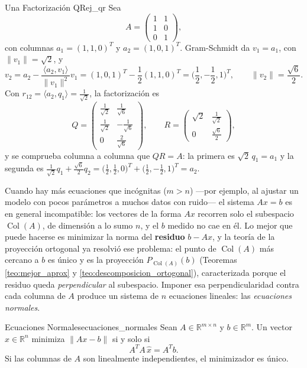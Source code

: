\documentclass[11pt, a4paper]{article}
\begin{document}
\begin{ejemplo}{Una Factorización QR}{ej_qr}
Sea
\[
A = \begin{pmatrix} 1 & 1 \\ 1 & 0 \\ 0 & 1 \end{pmatrix},
\]
con columnas $a_1 = (1,1,0)^T$ y $a_2 = (1,0,1)^T$. Gram-Schmidt da $v_1 = a_1$, con $\|v_1\| = \sqrt{2}$, y
\[
v_2 = a_2 - \frac{\langle a_2, v_1 \rangle}{\|v_1\|^2} v_1 = (1,0,1)^T - \frac{1}{2}(1,1,0)^T = \Big( \frac{1}{2}, -\frac{1}{2}, 1 \Big)^T,
\qquad \|v_2\| = \frac{\sqrt{6}}{2}.
\]
Con $r_{12} = \langle a_2, q_1 \rangle = \frac{1}{\sqrt{2}}$, la factorización es
\[
Q = \begin{pmatrix} \frac{1}{\sqrt{2}} & \frac{1}{\sqrt{6}} \\ \frac{1}{\sqrt{2}} & -\frac{1}{\sqrt{6}} \\ 0 & \frac{2}{\sqrt{6}} \end{pmatrix}, \qquad
R = \begin{pmatrix} \sqrt{2} & \frac{1}{\sqrt{2}} \\ 0 & \frac{\sqrt{6}}{2} \end{pmatrix},
\]
y se comprueba columna a columna que $QR = A$: la primera es $\sqrt{2} \, q_1 = a_1$ y la segunda es $\frac{1}{\sqrt{2}} q_1 + \frac{\sqrt{6}}{2} q_2 = \big( \frac{1}{2}, \frac{1}{2}, 0 \big)^T + \big( \frac{1}{2}, -\frac{1}{2}, 1 \big)^T = a_2$.
\end{ejemplo}

Cuando hay más ecuaciones que incógnitas ($m > n$) —por ejemplo, al ajustar un modelo con pocos parámetros a muchos datos con ruido— el sistema $Ax = b$ es en general incompatible: los vectores de la forma $Ax$ recorren solo el subespacio $\operatorname{Col}(A)$, de dimensión a lo sumo $n$, y el $b$ medido no cae en él. Lo mejor que puede hacerse es minimizar la norma del \textbf{residuo} $b - Ax$, y la teoría de la proyección ortogonal ya resolvió ese problema: el punto de $\operatorname{Col}(A)$ más cercano a $b$ es único y es la proyección $P_{\operatorname{Col}(A)}(b)$ (Teoremas \ref{teo:mejor_aprox} y \ref{teo:descomposicion_ortogonal}), caracterizada porque el residuo queda \emph{perpendicular} al subespacio. Imponer esa perpendicularidad contra cada columna de $A$ produce un sistema de $n$ ecuaciones lineales: las \emph{ecuaciones normales}.

\begin{teorema}{Ecuaciones Normales}{ecuaciones_normales}
Sean $A \in \mathbb{R}^{m \times n}$ y $b \in \mathbb{R}^m$. Un vector $\hat{x} \in \mathbb{R}^n$ minimiza $\|Ax - b\|$ si y solo si
\[
A^T A \, \hat{x} = A^T b.
\]
Si las columnas de $A$ son linealmente independientes, el minimizador es único.
\end{teorema}
\end{document}
